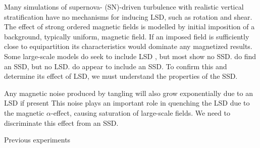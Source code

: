 \documentclass[preprint2]{aastex63}
\begin{document}
 Many simulations of supernova- (SN)-driven turbulence with realistic vertical
 stratification \citep[e.g.,][]{deAvillez:2005,PO07,Hill:2012a,HI14} have no
 mechanisms for inducing LSD, such as rotation and shear.
 The effect of strong ordered magnetic fields is modelled by initial
 imposition of a background, typically uniform, magnetic field.
 If an imposed field is sufficiently close to equipartition its characteristics
 would dominate any magnetized results.
 Some large-scale models do seek to include LSD \citep[e.g.,][]{Korpi:1999b,
 Gressel:2008,HWK09,WA09,Pakmor17,SBADMN19,GE20}, but most show no SSD.
 \citet{SBADMN19} do find an SSD, but no LSD.
 \citet{Gent:2013b,EGSFB16} do appear to include an SSD.
 To confirm this and determine its effect of LSD, we must understand the
 properties of the SSD.
     
 Any magnetic noise produced by tangling will also grow exponentially due to
 an LSD if present
 This noise plays an important role in quenching the LSD due to the magnetic
 $\alpha$-effect, causing saturation of large-scale fields.
 We need to discriminate this effect from an SSD.   


 Previous experiments \citep[e.g.,][]{BKMM04,BalKim05,MacLow:2005}
\end{document}
